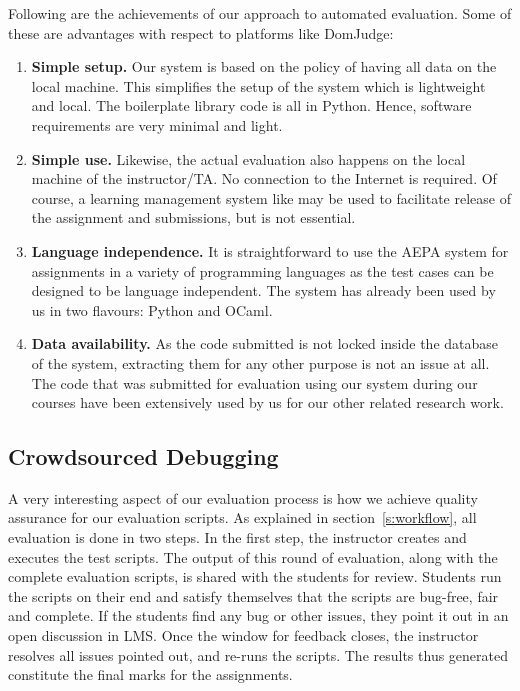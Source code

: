\documentclass[sigconf]{acmart}
\begin{document}
Following are the achievements of our approach to automated evaluation. Some of these are advantages with respect to platforms like DomJudge:
\begin{enumerate}
\item \textbf{Simple setup.} Our system is based on the policy of having all data on the local machine. This simplifies the setup of the system which is lightweight and local. The boilerplate library code is all in Python. Hence, software requirements are very minimal and light.
\item \textbf{Simple use.} Likewise, the actual evaluation also happens on the local machine of the instructor/TA. No connection to the Internet is required. Of course, a learning management system like \cite{moodle} may be used to facilitate release of the assignment and submissions, but is not essential.
\item \textbf{Language independence.} It is straightforward to use the AEPA system for assignments in a variety of programming languages as the test cases can be designed to be language independent. The system has already been used by us in two flavours: Python and OCaml.
\item \textbf{Data availability.} As the code submitted is not locked inside the database of the system, extracting them for any other purpose is not an issue at all. The code that was submitted for evaluation using our system during our courses have been extensively used by us for our other related research work\cite{10.1145/3412841.3442140}.
\end{enumerate}

\subsection{Crowdsourced Debugging} \label{s:cdebug}
A very interesting aspect of our evaluation process is how we achieve quality assurance for our evaluation scripts. As explained in section~\ref{s:workflow}, all evaluation is done in two steps. In the first step, the instructor creates and executes the test scripts. The output of this round of evaluation, along with the complete evaluation scripts, is shared with the students for review. Students run the scripts on their end and satisfy themselves that the scripts are bug-free, fair and complete. If the students find any bug or other issues, they point it out in an open discussion in LMS. Once the window for feedback closes, the instructor resolves all issues pointed out, and re-runs the scripts. The results thus generated constitute the final marks for the assignments.
\end{document}
